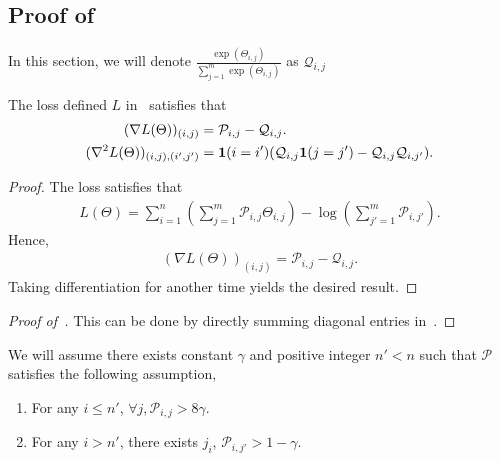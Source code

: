 \subsection{Proof of~}


In this section, we will denote $\frac{\exp(\Theta_{i, j})}{\sum_{j = 1}^m {\exp(\Theta_{i, j})}}$ as $\mathcal{Q}_{i,j}$


\begin{lemma}
\label{lem:helpsharp}

The loss defined $L$ in~ satisfies that
\begin{align*}
        (\nabla L(\Theta))_{(i,j)} &= \mathcal{P}_{i,j}  - \mathcal{Q}_{i,j}.\\
    (\nabla^2 L(\Theta))_{(i,j), (i',j')} &= \mathbf{1}(i = i') (\mathcal{Q}_{i,j} \mathbf{1}(j = j') - \mathcal{Q}_{i,j} \mathcal{Q}_{i, j'}).
\end{align*}
\end{lemma}

\begin{proof}
    The loss satisfies that
    \begin{align*}
        L(\Theta) = \sum_{i = 1}^n (\sum_{j = 1}^m \mathcal{P}_{i,j} \Theta_{i,j}) - \log(\sum_{j' = 1}^m \mathcal{P}_{i,j'}).
    \end{align*}
    Hence,
    \begin{align*}
        (\nabla L(\Theta))_{(i,j)} = \mathcal{P}_{i,j}  - \mathcal{Q}_{i,j}.
    \end{align*}
    Taking differentiation for another time yields the desired result.
\end{proof}


\begin{proof}[Proof of~]
    This can be done by directly summing diagonal entries in~.
\end{proof}

\begin{assumption}
\label{assum:P}
    We will assume there exists constant $\gamma$ and positive integer $n' < n$ such that $\mathcal{P}$ satisfies the following assumption,
    \begin{enumerate}
        \item For any $i \le n'$, $\forall j, \mathcal{P}_{i,j} > 8\gamma$.
        \item For any $i > n'$, there exists $j_i$, $\mathcal{P}_{i,j'} > 1 - \gamma$.
    \end{enumerate}
\end{assumption}



